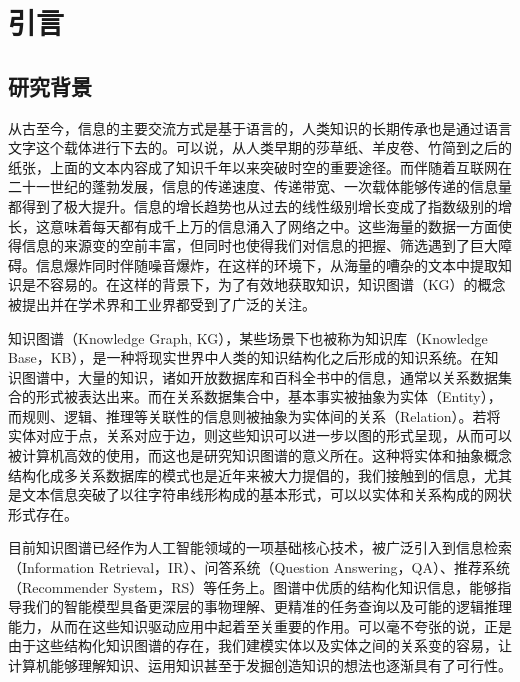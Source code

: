 \chapter{引言}
\label{cha:intro}


\section{研究背景}


从古至今，信息的主要交流方式是基于语言的，人类知识的长期传承也是通过语言文字这个载体进行下去的。可以说，从人类早期的莎草纸、羊皮卷、竹简到之后的纸张，上面的文本内容成了知识千年以来突破时空的重要途径。而伴随着互联网在二十一世纪的蓬勃发展，信息的传递速度、传递带宽、一次载体能够传递的信息量都得到了极大提升。信息的增长趋势也从过去的线性级别增长变成了指数级别的增长，这意味着每天都有成千上万的信息涌入了网络之中。这些海量的数据一方面使得信息的来源变的空前丰富，但同时也使得我们对信息的把握、筛选遇到了巨大障碍。信息爆炸同时伴随噪音爆炸，在这样的环境下，从海量的嘈杂的文本中提取知识是不容易的。在这样的背景下，为了有效地获取知识，知识图谱（KG）的概念被提出并在学术界和工业界都受到了广泛的关注。

知识图谱（Knowledge Graph, KG），某些场景下也被称为知识库（Knowledge Base，KB），是一种将现实世界中人类的知识结构化之后形成的知识系统。在知识图谱中，大量的知识，诸如开放数据库和百科全书中的信息，通常以关系数据集合的形式被表达出来。而在关系数据集合中，基本事实被抽象为实体（Entity），而规则、逻辑、推理等关联性的信息则被抽象为实体间的关系（Relation）。若将实体对应于点，关系对应于边，则这些知识可以进一步以图的形式呈现，从而可以被计算机高效的使用，而这也是研究知识图谱的意义所在。这种将实体和抽象概念结构化成多关系数据库的模式也是近年来被大力提倡的，我们接触到的信息，尤其是文本信息突破了以往字符串线形构成的基本形式，可以以实体和关系构成的网状形式存在。


目前知识图谱已经作为人工智能领域的一项基础核心技术，被广泛引入到信息检索（Information Retrieval，IR）、问答系统（Question Answering，QA）、推荐系统（Recommender System，RS）等任务上。图谱中优质的结构化知识信息，能够指导我们的智能模型具备更深层的事物理解、更精准的任务查询以及可能的逻辑推理能力，从而在这些知识驱动应用中起着至关重要的作用。可以毫不夸张的说，正是由于这些结构化知识图谱的存在，我们建模实体以及实体之间的关系变的容易，让计算机能够理解知识、运用知识甚至于发掘创造知识的想法也逐渐具有了可行性。

